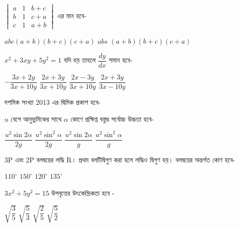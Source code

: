 \documentclass[addpoints]{exam}
\begin{document}
\begin{questions}
\question $\begin{vmatrix}
a & 1 & b+c \\
b & 1 & c+a\\
c & 1 & a+b
\end{vmatrix} $  এর মান হবে-

\begin{oneparchoices}
\choice $ abc(a+b)(b+c)(c+a) $
\choice $ abs $
\choice  $ (a+b)(b+c)(c+a) $
\end{oneparchoices}

\question  $ x^{2}+3xy+5y^{2}=1 $ যদি হয় তাহলে $ \dfrac{dy}{dx} $ সমান হবে-

\begin{oneparchoices}
\choice $ -\dfrac{3x+2y}{3x+10y} $
\choice $ \dfrac{2x+3y}{3x+10y} $
\choice $ \dfrac{2x-3y}{3x+10y} $
\choice $ \dfrac{2x+3y}{3x-10y} $
\end{oneparchoices}

\question   দশমিক সংখ্যা 2013 এর দ্বিমিক প্রকাশ হবে-

\begin{oneparchoices}

\end{oneparchoices}

\question  $ u $ বেগে আনুভুমিকের সাথে $ \alpha $ কোণে প্রক্ষিপ্ত বস্তুর সর্বোচ্চ উচ্চতা হবে-

\begin{oneparchoices}
\choice $ \dfrac{u^{2}\sin 2\alpha}{2g} $
\choice $ \dfrac{u^{2}\sin^{2}\alpha}{2g} $
\choice $ \dfrac{u^{2}\sin 2\alpha}{g} $
\choice $ \dfrac{u^{2}\sin^{2}\alpha}{g} $

\end{oneparchoices}

\question  3P এবং 2P বলদ্বয়ের লদ্ধি R। প্রথম বলটিদ্বিগুণ করা হলে লদ্ধিও দ্বিগুণ হয়। বলদ্বয়ের অন্তর্গত কোণ হবে-

\begin{oneparchoices}
\choice $ 110^{\circ} $
\choice $ 150^{\circ} $
\choice $ 120^{\circ} $
\choice $ 135^{\circ} $

\end{oneparchoices}

\question $ 3x^{2}+5y^{2} =15 $ উপবৃত্তের উৎকেন্দ্রিকতা হবে -

\begin{oneparchoices}
\choice $ \sqrt{\dfrac{3}{5}} $
\choice $ \sqrt{\dfrac{5}{3}} $
\choice $ \sqrt{\dfrac{2}{5}} $
\choice $ \sqrt{\dfrac{5}{2}} $


\end{oneparchoices}
\end{questions}
\end{document}
